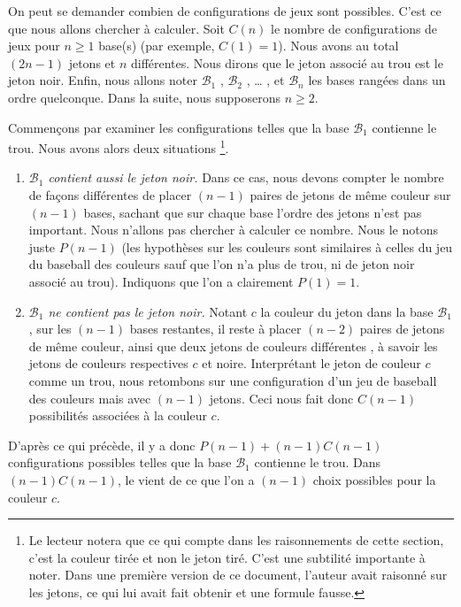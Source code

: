 On peut se demander combien de configurations de jeux sont possibles. C'est ce que nous allons chercher à calculer. Soit $C(n)$ le nombre de configurations de jeux pour $n \geqslant 1$ base(s) (par exemple, $C(1) = 1$). Nous avons au total $(2n - 1)$ jetons et $n$  différentes.
Nous dirons que le jeton associé au trou est le jeton noir. 
Enfin, nous allons noter $\mathcal{B}_1$ , $\mathcal{B}_2$ , \dots{} , et  $\mathcal{B}_n$ les bases rangées dans un ordre quelconque. Dans la suite, nous supposerons $n \geqslant 2$.


\medskip

Commençons par examiner les configurations telles que la base $\mathcal{B}_1$ contienne le trou. Nous avons alors deux situations
\footnote{
	Le lecteur notera que ce qui compte dans les raisonnements de cette section, c'est la couleur tirée et non le jeton tiré. C'est une subtilité importante à noter.
	Dans une première version de ce document, l'auteur avait raisonné sur les jetons, ce qui lui avait fait obtenir et  une formule fausse.
}.

\begin{enumerate}
    \item \textit{$\mathcal{B}_1$ contient aussi le jeton noir.} 
    Dans ce cas, nous devons compter le nombre de façons différentes de placer $(n - 1)$ paires de jetons de même couleur sur $(n-1)$ bases, sachant que sur chaque base l'ordre des jetons n'est pas important. Nous n'allons pas chercher à calculer ce nombre. Nous le notons juste $P(n - 1)$ (les hypothèses sur les couleurs sont similaires à celles du jeu du baseball des couleurs sauf que l'on n'a plus de trou, ni de jeton noir associé au trou). Indiquons que l'on a clairement $P(1) = 1$.
        
    \item \textit{$\mathcal{B}_1$ ne contient pas le jeton noir.} 
    Notant $c$ la couleur du jeton dans la base $\mathcal{B}_1$, sur les $(n-1)$ bases restantes, il reste à placer $(n - 2)$ paires de jetons de même couleur, ainsi que deux jetons de couleurs différentes , à savoir les jetons de couleurs respectives $c$ et noire. Interprétant le jeton de couleur $c$ comme un trou, nous retombons sur une configuration d'un jeu de baseball des couleurs mais avec $(n-1)$ jetons. Ceci nous fait donc $C(n -1)$ possibilités associées à la couleur $c$. 
\end{enumerate}

D'après ce qui précède, il y a donc $P(n - 1) + (n-1) C(n-1)$ configurations possibles telles que la base $\mathcal{B}_1$ contienne le trou. Dans $(n-1) C(n-1)$, le  vient de ce que l'on a $(n-1)$ choix possibles pour la couleur $c$.


